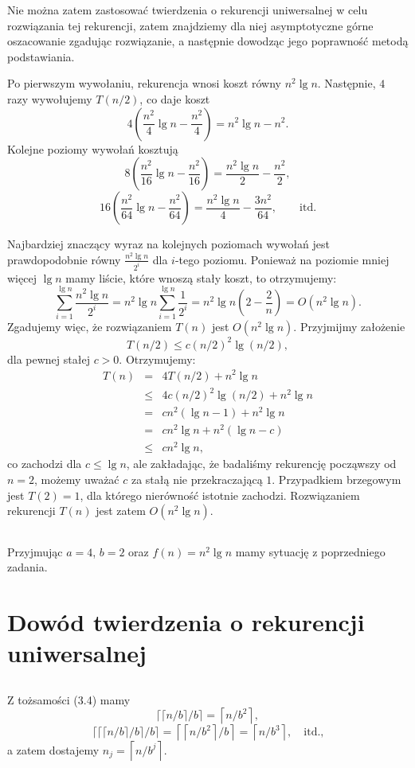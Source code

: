 Nie można zatem zastosować twierdzenia o rekurencji uniwersalnej w celu rozwiązania tej rekurencji, zatem znajdziemy dla niej asymptotyczne górne oszacowanie zgadując rozwiązanie, a następnie dowodząc jego poprawność metodą podstawiania.

Po pierwszym wywołaniu, rekurencja wnosi koszt równy $n^2\lg n$. Następnie, $4$ razy wywołujemy $T(n/2)$, co daje koszt
\[
	4\left(\frac{n^2}{4}\lg n-\frac{n^2}{4}\right) = n^2\lg n-n^2.
\]
Kolejne poziomy wywołań kosztują
\[
	8\left(\frac{n^2}{16}\lg n-\frac{n^2}{16}\right) = \frac{n^2\lg n}{2}-\frac{n^2}{2},
\]
\[
	16\left(\frac{n^2}{64}\lg n-\frac{n^2}{64}\right) = \frac{n^2\lg n}{4}-\frac{3n^2}{64},\qquad\mbox{itd.}
\]

Najbardziej znaczący wyraz na kolejnych poziomach wywołań jest prawdopodobnie równy $\frac{n^2\lg n}{2^i}$ dla $i$-tego poziomu. Ponieważ na poziomie mniej więcej $\lg n$ mamy liście, które wnoszą stały koszt, to otrzymujemy:
\[
	\sum_{i=1}^{\lg n}\frac{n^2\lg n}{2^i} = n^2\lg n\sum_{i=1}^{\lg n}\frac{1}{2^i} = n^2\lg n\left(2-\frac{2}{n}\right) = O(n^2\lg n).
\]
Zgadujemy więc, że rozwiązaniem $T(n)$ jest $O(n^2\lg n)$. Przyjmijmy założenie
\[
	T(n/2)\le c(n/2)^2\lg(n/2),
\]
dla pewnej stałej $c>0$. Otrzymujemy:
\begin{eqnarray*}
	T(n) &=& 4T(n/2)+n^2\lg n \\
	&\le& 4c(n/2)^2\lg(n/2)+n^2\lg n \\
	&=& cn^2(\lg n-1)+n^2\lg n \\
	&=& cn^2\lg n+n^2(\lg n-c) \\
	&\le& cn^2\lg n,
\end{eqnarray*}
co zachodzi dla $c\le\lg n$, ale zakładając, że badaliśmy rekurencję począwszy od $n=2$, możemy uważać $c$ za stałą nie przekraczającą $1$. Przypadkiem brzegowym jest $T(2)=1$, dla którego nierówność istotnie zachodzi. Rozwiązaniem rekurencji $T(n)$ jest zatem $O(n^2\lg n)$.

\subsection{} %
Przyjmując $a=4$, $b=2$ oraz $f(n)=n^2\lg n$ mamy sytuację z poprzedniego zadania.

\section{Dowód twierdzenia o rekurencji uniwersalnej}

\subsection{} %
Z tożsamości (3.4) mamy
\[
	\lceil\lceil n/b\rceil/b\rceil = \left\lceil n/b^2\right\rceil,
\]
\[
	\lceil\lceil\lceil n/b\rceil/b\rceil/b\rceil=\left\lceil\left\lceil n/b^2\right\rceil/b\right\rceil=\left\lceil n/b^3\right\rceil,\quad\mbox{itd.,}
\]
a zatem dostajemy $n_j=\left\lceil n/b^j\right\rceil$.

